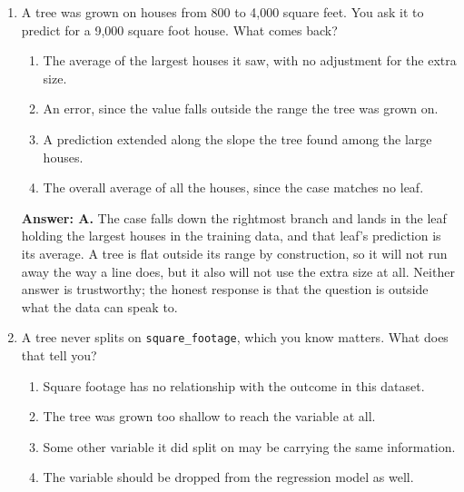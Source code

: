 \documentclass[11pt]{article}
\begin{document}
\begin{enumerate}[itemsep=14pt]
\vspace{2pt}
\textbf{Answer: D.} The first curve can always be driven to zero by giving every row its own leaf, so it cannot choose anything. The held-back error is the one measuring prediction on rows the tree has never seen, and its minimum is the honest answer. The gap between the curves tells you how much the tree is memorizing, but closing the gap is not the goal.
\vspace{4pt}

\item A tree was grown on houses from 800 to 4,000 square feet. You ask it to predict for a 9,000 square foot house. What comes back?

\begin{enumerate}[label=\Alph*., itemsep=1pt, topsep=3pt]
  \item The average of the largest houses it saw, with no adjustment for the extra size.
  \item An error, since the value falls outside the range the tree was grown on.
  \item A prediction extended along the slope the tree found among the large houses.
  \item The overall average of all the houses, since the case matches no leaf.
\end{enumerate}

\vspace{2pt}
\textbf{Answer: A.} The case falls down the rightmost branch and lands in the leaf holding the largest houses in the training data, and that leaf's prediction is its average. A tree is flat outside its range by construction, so it will not run away the way a line does, but it also will not use the extra size at all. Neither answer is trustworthy; the honest response is that the question is outside what the data can speak to.
\vspace{4pt}

\item A tree never splits on \texttt{square\_footage}, which you know matters. What does that tell you?

\begin{enumerate}[label=\Alph*., itemsep=1pt, topsep=3pt]
  \item Square footage has no relationship with the outcome in this dataset.
  \item The tree was grown too shallow to reach the variable at all.
  \item Some other variable it did split on may be carrying the same information.
  \item The variable should be dropped from the regression model as well.
\end{enumerate}


\end{enumerate}
\end{document}
